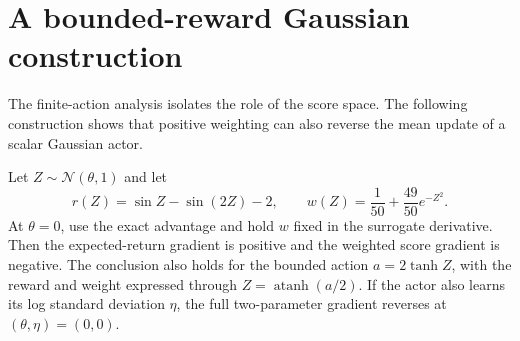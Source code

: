 \section{A bounded-reward Gaussian construction}
\label{app:gaussian}

The finite-action analysis isolates the role of the score space. The following construction shows that positive weighting can also reverse the mean update of a scalar Gaussian actor.

\begin{proposition}
\label{prop:gaussian}
Let $Z\sim\mathcal N(\theta,1)$ and let
\[
r(Z)=\sin Z-\sin(2Z)-2,\qquad
w(Z)=\frac1{50}+\frac{49}{50}e^{-Z^2}.
\]
At $\theta=0$, use the exact advantage and hold $w$ fixed in the surrogate derivative. Then the expected-return gradient is positive and the weighted score gradient is negative. The conclusion also holds for the bounded action $a=2\tanh Z$, with the reward and weight expressed through $Z=\operatorname{atanh}(a/2)$. If the actor also learns its log standard deviation $\eta$, the full two-parameter gradient reverses at $(\theta,\eta)=(0,0)$.
\end{proposition}

